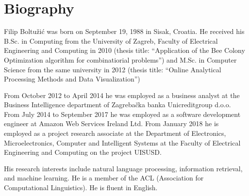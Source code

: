 \renewcommand{\leftmark}{Biography}
\chapter*{Biography}

Filip Boltužić was born on September 19, 1988 in Sisak, Croatia. 
He received his B.Sc. in Computing from the University of Zagreb, 
Faculty of Electrical Engineering and Computing in 2010 (thesis title:
``Application of the Bee Colony Optimization algorithm for combinatiorial problems'')
and M.Sc. in Computer Science from the same university in 2012 (thesis title:
``Online Analytical Processing Methods and Data Visualization'')

From October 2012 to April 2014 he was employed as a business analyst
at the Business Intelligence department of Zagrebačka banka Unicreditgroup d.o.o.
From July 2014 to September 2017 he was employed as a software 
development engineer at Amazon Web Services Ireland Ltd. From January 2018 
he is employed as a project research associate at the
Department of Electronics, Microelectronics, Computer and 
Intelligent Systems at the Faculty of Electrical Engineering and Computing on the project
UISUSD.

His research interests include natural language processing, information 
retrieval, and machine learning. He is a member of the ACL (Association for
Computational Linguistics). He is fluent in English.
